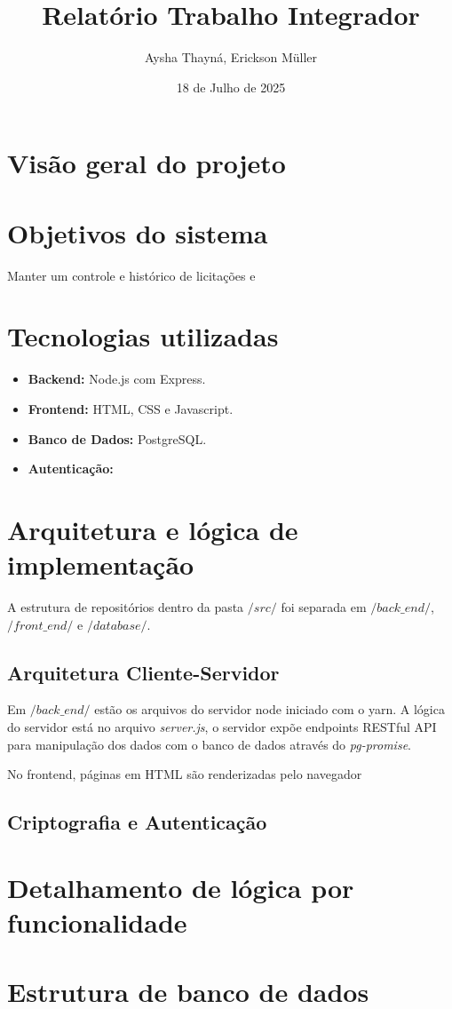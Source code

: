 \documentclass[ ]{article}
\title{Relatório Trabalho Integrador}
\date{18 de Julho de 2025}
\author{Aysha Thayná, Erickson Müller}
\begin{document}
	\maketitle
	\newpage
	\section{Visão geral do projeto}
	\section{Objetivos do sistema}
		Manter um controle e histórico de licitações e 
	\section{Tecnologias utilizadas}
		\begin{itemize}
			\item \textbf{Backend:} Node.js com Express.
			\item \textbf{Frontend:} HTML, CSS e Javascript.
			\item \textbf{Banco de Dados:} PostgreSQL.
			\item \textbf{Autenticação:}	
		\end{itemize}
	\section{Arquitetura e lógica de implementação}
		A estrutura de repositórios dentro da pasta $/src/$ foi separada em $/back\_end/$, $/front\_end/$ e $/database/$. 
		\subsection{Arquitetura Cliente-Servidor}
			Em $/back\_end/$ estão os arquivos do servidor node iniciado com o yarn. A lógica do servidor está no arquivo \textit{server.js}, o servidor expõe endpoints RESTful API para manipulação dos dados com o banco de dados através do \textit{pg-promise}.
			
			No frontend, páginas em HTML são renderizadas pelo navegador
		\subsection{Criptografia e Autenticação}
	\section{Detalhamento de lógica por funcionalidade}
	\section{Estrutura de banco de dados}
\end{document}
